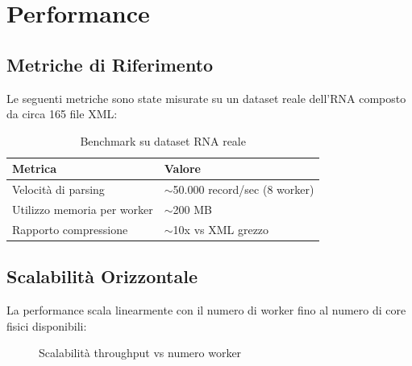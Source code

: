 \chapter{Performance}

\section{Metriche di Riferimento}

Le seguenti metriche sono state misurate su un dataset reale dell'RNA composto da circa 165 file XML:

\begin{table}[h]
\centering
\begin{tabular}{@{}ll@{}}
\toprule
\textbf{Metrica} & \textbf{Valore} \\
\midrule
Velocità di parsing & $\sim$50.000 record/sec (8 worker) \\
Utilizzo memoria per worker & $\sim$200 MB \\
Rapporto compressione & $\sim$10x vs XML grezzo \\
\bottomrule
\end{tabular}
\caption{Benchmark su dataset RNA reale}
\end{table}

\section{Scalabilità Orizzontale}

La performance scala linearmente con il numero di worker fino al numero di core fisici disponibili:

\begin{figure}[h]
\centering
{}
\caption{Scalabilità throughput vs numero worker}
\end{figure}

